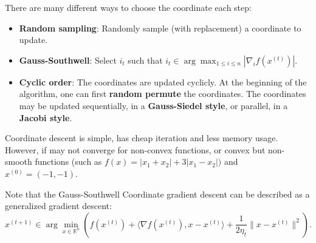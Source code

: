 \documentclass[openany]{book}
\theoremstyle{definition}
\theoremstyle{remark}
\begin{document}
There are many different ways to choose the coordinate each step:
\begin{itemize}
    \item \textbf{Random sampling}: Randomly sample (with replacement) a coordinate to update.
    \item \textbf{Gauss-Southwell}: Select $i_t$ such that $i_t\in\arg\max_{1\le i\le n}|\nabla_i f(x^{(t)})|$.
    \item \textbf{Cyclic order}: The coordinates are updated cyclicly. At the beginning of the algorithm, one can first \textbf{random permute} the coordinates. The coordinates may be updated sequentially, in a \textbf{Gauss-Siedel style}, or parallel, in a \textbf{Jacobi style}.
\end{itemize}

Coordinate descent is simple, has cheap iteration and less memory usage. However, if may not converge for non-convex functions, or convex but non-smooth functions (such as $f(x)=|x_1+x_2|+3|x_1-x_2|)$ and $x^{(0)}=(-1,-1)$.

Note that the Gauss-Southwell Coordinate gradient descent can be described as a generalized gradient descent:
\begin{equation}
    x^{(t+1)}\in\arg\min_{x\in \mathbb{R}^n}\left(f(x^{(t)})+\langle\nabla f(x^{(t)}),x-x^{(t)}\rangle+\frac{1}{2\eta_t}\|x-x^{(t)}\|^2\right).
\end{equation}
\end{document}
